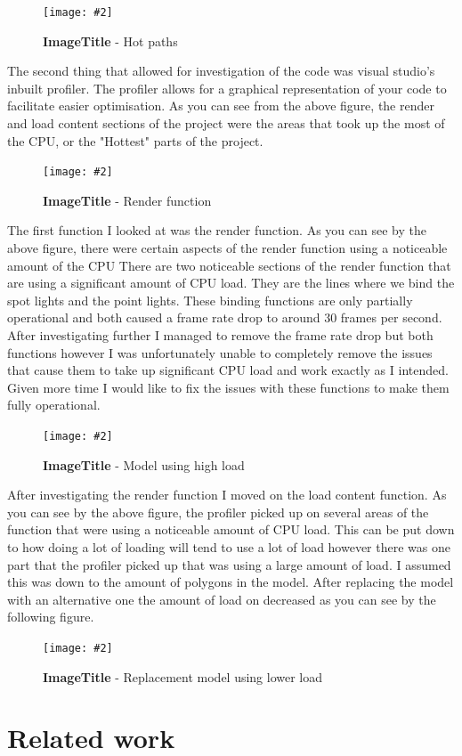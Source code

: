 \documentclass[10pt, a4paper]{article}
\newcommand{\figuremacro}[5]{
    \begin{figure}[#1]
        \centering
        \texttt{[image: \#2]}
        \caption[#3]{\textbf{#3}#4}
        \label{fig:#2}
    \end{figure}
}
\begin{document}
\figuremacro{h}{hotpath.jpg}{ImageTitle}{ - Hot paths}{1.0}

The second thing that allowed for investigation of the code was visual studio's inbuilt profiler. The profiler allows for a graphical representation of your code to facilitate easier optimisation.
As you can see from the above figure, the render and load content sections of the project were the areas that took up the most of the CPU, or the "Hottest" parts of the project. 

\figuremacro{h}{render.jpg}{ImageTitle}{ - Render function}{1.0}

The first function I looked at was the render function. As you can see by the above figure, there were certain aspects of the render function using a noticeable amount of the CPU
There are two noticeable sections of the render function that are using a significant amount of CPU load. They are the lines where we bind the spot lights and the point lights.  
These binding functions are only partially operational and both caused a frame rate drop to around 30 frames per second. After investigating further I managed to remove the frame rate drop but 
both functions however I was unfortunately unable to completely remove the issues that cause them to take up significant CPU load and work exactly as I intended. Given more time I would
like to fix the issues with these functions to make them fully operational.

\figuremacro{h}{loadcontent.png}{ImageTitle}{ - Model using high load}{1.0}

After investigating the render function I moved on the load content function. As you can see by the above figure, the profiler picked up on several areas of the function that were using a noticeable 
amount of CPU load. This can be put down to how doing a lot of loading will tend to use a lot of load however there was one part that the profiler picked up that was using a large 
amount of load. I assumed this was down to the amount of polygons in the model. After replacing the model with an alternative one the amount of load on decreased as you can see by the following figure.

\figuremacro{h}{replacementloadcontent.png}{ImageTitle}{ - Replacement model using lower load}{0.8}





   
\section{Related work}
\end{document}
